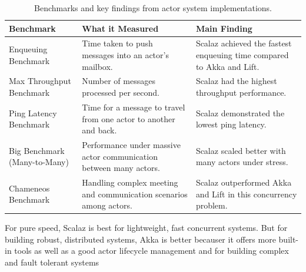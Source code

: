 \begin{table}[!htp]
    \centering
    \caption{Benchmarks and key findings from actor system implementations.}
    \label{tab:benchmarks_conducted}
    \begin{tabularx}{\textwidth}{|>{\raggedright\arraybackslash}X|>{\raggedright\arraybackslash}X|>{\raggedright\arraybackslash}X|}
        \hline
        \textbf{Benchmark} & \textbf{What it Measured} & \textbf{Main Finding} \\
        \hline
        Enqueuing Benchmark & Time taken to push messages into an actor's mailbox. & Scalaz achieved the fastest enqueuing time compared to Akka and Lift. \\
        \hline
        Max Throughput Benchmark & Number of messages processed per second. & Scalaz had the highest throughput performance. \\
        \hline
        Ping Latency Benchmark & Time for a message to travel from one actor to another and back. & Scalaz demonstrated the lowest ping latency. \\
        \hline
        Big Benchmark (Many-to-Many) & Performance under massive actor communication between many actors. & Scalaz scaled better with many actors under stress. \\
        \hline
        Chameneos Benchmark & Handling complex meeting and communication scenarios among actors. & Scalaz outperformed Akka and Lift in this concurrency problem. \\
        \hline
    \end{tabularx}
\end{table}

For pure speed, Scalaz is best for lightweight, fast concurrent systems. But for building robust, distributed systems, Akka is better becauser it offers more built-in tools as well as a good actor lifecycle management and for building complex and fault tolerant systems







